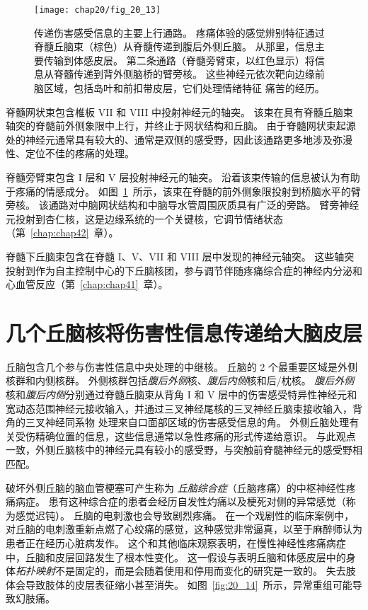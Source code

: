 \begin{figure}[htbp]
	\centering
	\texttt{[image: chap20/fig\_20\_13]}
	\caption{传递伤害感受信息的主要上行通路。
		疼痛体验的感觉辨别特征通过脊髓丘脑束（棕色）从脊髓传递到腹后外侧丘脑。
		从那里，信息主要传输到体感皮层。
		第二条通路（脊髓旁臂束，以红色显示）将信息从脊髓传递到背外侧脑桥的臂旁核。
		这些神经元依次靶向边缘前脑区域，包括岛叶和前扣带皮层，它们处理情绪特征 痛苦的经历。}
	\label{fig:20_13}
\end{figure}


脊髓网状束包含椎板 VII 和 VIII 中投射神经元的轴突。
该束在具有脊髓丘脑束轴突的脊髓前外侧象限中上行，并终止于网状结构和丘脑。
由于脊髓网状束起源处的神经元通常具有较大的、通常是双侧的感受野，因此该通路更多地涉及弥漫性、定位不佳的疼痛的处理。


脊髓旁臂束包含 I 层和 V 层投射神经元的轴突。
沿着该束传输的信息被认为有助于疼痛的情感成分。
如图~\ref{fig:20_13}~所示，该束在脊髓的前外侧象限投射到桥脑水平的臂旁核。
该通路对中脑网状结构和中脑导水管周围灰质具有广泛的旁路。
臂旁神经元投射到杏仁核，这是边缘系统的一个关键核，它调节情绪状态（第~\ref{chap:chap42}~章）。


脊髓下丘脑束包含在脊髓 I、V、VII 和 VIII 层中发现的神经元轴突。
这些轴突投射到作为自主控制中心的下丘脑核团，参与调节伴随疼痛综合症的神经内分泌和心血管反应（第~\ref{chap:chap41}~章）。



\section{几个丘脑核将伤害性信息传递给大脑皮层}

丘脑包含几个参与伤害性信息中央处理的中继核。
丘脑的 2 个最重要区域是外侧核群和内侧核群。
外侧核群包括\textit{腹后外侧}核、\textit{腹后内侧}核和后/枕核。
\textit{腹后外侧}核和\textit{腹后内侧}分别通过脊髓丘脑束从背角 I 和 V 层中的伤害感受特异性神经元和宽动态范围神经元接收输入，并通过三叉神经尾核的三叉神经丘脑束接收输入，背角的三叉神经同系物 处理来自口面部区域的伤害感受信息的角。
外侧丘脑处理有关受伤精确位置的信息，这些信息通常以急性疼痛的形式传递给意识。
与此观点一致，外侧丘脑核中的神经元具有较小的感受野，与突触前脊髓神经元的感受野相匹配。


破坏外侧丘脑的脑血管梗塞可产生称为 \textit{丘脑综合症}（丘脑疼痛）的中枢神经性疼痛病症。
患有这种综合症的患者会经历自发性灼痛以及梗死对侧的异常感觉（称为感觉迟钝）。
丘脑的电刺激也会导致剧烈疼痛。
在一个戏剧性的临床案例中，对丘脑的电刺激重新点燃了心绞痛的感觉，这种感觉非常逼真，以至于麻醉师认为患者正在经历心脏病发作。
这个和其他临床观察表明，在慢性神经性疼痛病症中，丘脑和皮层回路发生了根本性变化。
这一假设与表明丘脑和体感皮层中的身体\textit{拓扑映射}不是固定的，而是会随着使用和停用而变化的研究是一致的。
失去肢体会导致肢体的皮层表征缩小甚至消失。
如图~\ref{fig:20_14}~所示，异常重组可能导致幻肢痛。


